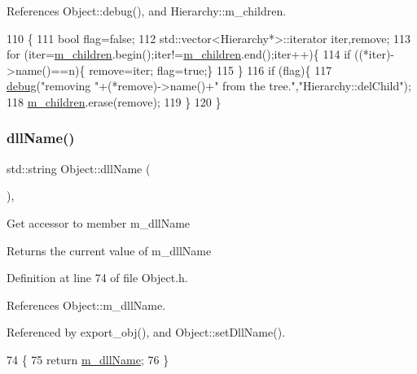 References Object\+::debug(), and Hierarchy\+::m\+\_\+children.


\begin{DoxyCode}
110                                    \{
111   \textcolor{keywordtype}{bool} flag=\textcolor{keyword}{false};
112   std::vector<Hierarchy*>::iterator iter,\textcolor{keyword}{remove};
113   \textcolor{keywordflow}{for} (iter=\hyperlink{classHierarchy_a038816763941fd4a930504917f60483b}{m\_children}.begin();iter!=\hyperlink{classHierarchy_a038816763941fd4a930504917f60483b}{m\_children}.end();iter++)\{
114     \textcolor{keywordflow}{if} ((*iter)->name()==n)\{ \textcolor{keyword}{remove}=iter; flag=\textcolor{keyword}{true};\}
115   \}
116   \textcolor{keywordflow}{if} (flag)\{
117     \hyperlink{classObject_aac010553f022165573714b7014a15f0d}{debug}(\textcolor{stringliteral}{"removing "}+(*remove)->name()+\textcolor{stringliteral}{" from the tree."},\textcolor{stringliteral}{"Hierarchy::delChild"});
118     \hyperlink{classHierarchy_a038816763941fd4a930504917f60483b}{m\_children}.erase(\textcolor{keyword}{remove});
119   \}
120 \}
\end{DoxyCode}
\mbox{\label{classObject_a2e3947f2870094c332d7454117f3ec63}} 
\subsubsection{\texorpdfstring{dll\+Name()}{dllName()}}
{\footnotesize\ttfamily std\+::string Object\+::dll\+Name (\begin{DoxyParamCaption}{ }\end{DoxyParamCaption})\hspace{0.3cm}{\ttfamily [inline]}, {\ttfamily [inherited]}}

Get accessor to member m\+\_\+dll\+Name \begin{DoxyReturn}{Returns}
the current value of m\+\_\+dll\+Name 
\end{DoxyReturn}


Definition at line 74 of file Object.\+h.



References Object\+::m\+\_\+dll\+Name.



Referenced by export\+\_\+obj(), and Object\+::set\+Dll\+Name().


\begin{DoxyCode}
74                        \{
75     \textcolor{keywordflow}{return} \hyperlink{classObject_a01afbeacebb8db6831559972ec362eb3}{m\_dllName};
76   \}  
\end{DoxyCode}
\mbox{\label{classObject_a204a95f57818c0f811933917a30eff45}} 

